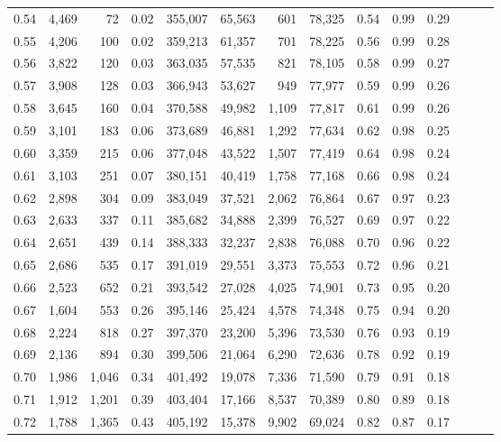 \begin{tabular}{rrrrrrrrrrrrrr}
0.54 &  4,469 &     72 &  0.02 &  355,007 &   65,563 &     601 &  78,325 &  0.54 &  0.99 &      0.29 \\
0.55 &  4,206 &    100 &  0.02 &  359,213 &   61,357 &     701 &  78,225 &  0.56 &  0.99 &      0.28 \\
0.56 &  3,822 &    120 &  0.03 &  363,035 &   57,535 &     821 &  78,105 &  0.58 &  0.99 &      0.27 \\
0.57 &  3,908 &    128 &  0.03 &  366,943 &   53,627 &     949 &  77,977 &  0.59 &  0.99 &      0.26 \\
0.58 &  3,645 &    160 &  0.04 &  370,588 &   49,982 &   1,109 &  77,817 &  0.61 &  0.99 &      0.26 \\
0.59 &  3,101 &    183 &  0.06 &  373,689 &   46,881 &   1,292 &  77,634 &  0.62 &  0.98 &      0.25 \\
0.60 &  3,359 &    215 &  0.06 &  377,048 &   43,522 &   1,507 &  77,419 &  0.64 &  0.98 &      0.24 \\
0.61 &  3,103 &    251 &  0.07 &  380,151 &   40,419 &   1,758 &  77,168 &  0.66 &  0.98 &      0.24 \\
0.62 &  2,898 &    304 &  0.09 &  383,049 &   37,521 &   2,062 &  76,864 &  0.67 &  0.97 &      0.23 \\
0.63 &  2,633 &    337 &  0.11 &  385,682 &   34,888 &   2,399 &  76,527 &  0.69 &  0.97 &      0.22 \\
0.64 &  2,651 &    439 &  0.14 &  388,333 &   32,237 &   2,838 &  76,088 &  0.70 &  0.96 &      0.22 \\
0.65 &  2,686 &    535 &  0.17 &  391,019 &   29,551 &   3,373 &  75,553 &  0.72 &  0.96 &      0.21 \\
0.66 &  2,523 &    652 &  0.21 &  393,542 &   27,028 &   4,025 &  74,901 &  0.73 &  0.95 &      0.20 \\
0.67 &  1,604 &    553 &  0.26 &  395,146 &   25,424 &   4,578 &  74,348 &  0.75 &  0.94 &      0.20 \\
0.68 &  2,224 &    818 &  0.27 &  397,370 &   23,200 &   5,396 &  73,530 &  0.76 &  0.93 &      0.19 \\
0.69 &  2,136 &    894 &  0.30 &  399,506 &   21,064 &   6,290 &  72,636 &  0.78 &  0.92 &      0.19 \\
0.70 &  1,986 &  1,046 &  0.34 &  401,492 &   19,078 &   7,336 &  71,590 &  0.79 &  0.91 &      0.18 \\
0.71 &  1,912 &  1,201 &  0.39 &  403,404 &   17,166 &   8,537 &  70,389 &  0.80 &  0.89 &      0.18 \\
0.72 &  1,788 &  1,365 &  0.43 &  405,192 &   15,378 &   9,902 &  69,024 &  0.82 &  0.87 &      0.17 \\

\end{tabular}
